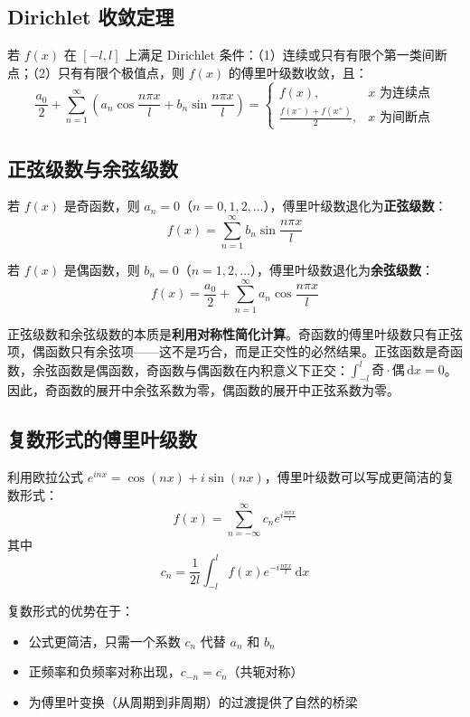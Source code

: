 \subsection{Dirichlet 收敛定理}

若 $f(x)$ 在 $[-l, l]$ 上满足 Dirichlet 条件：（1）连续或只有有限个第一类间断点；（2）只有有限个极值点，则 $f(x)$ 的傅里叶级数收敛，且：
\[
\frac{a_0}{2} + \sum_{n=1}^\infty \left(a_n\cos\frac{n\pi x}{l} + b_n\sin\frac{n\pi x}{l}\right) = \begin{cases} f(x), & x\text{ 为连续点} \\ \frac{f(x^-)+f(x^+)}{2}, & x\text{ 为间断点} \end{cases}
\]

\subsection{正弦级数与余弦级数}

若 $f(x)$ 是奇函数，则 $a_n = 0$（$n = 0, 1, 2, \ldots$），傅里叶级数退化为\textbf{正弦级数}：
\[
f(x) = \sum_{n=1}^\infty b_n\sin\frac{n\pi x}{l}
\]

若 $f(x)$ 是偶函数，则 $b_n = 0$（$n = 1, 2, \ldots$），傅里叶级数退化为\textbf{余弦级数}：
\[
f(x) = \frac{a_0}{2} + \sum_{n=1}^\infty a_n\cos\frac{n\pi x}{l}
\]

\begin{essencebox}
正弦级数和余弦级数的本质是\textbf{利用对称性简化计算}。奇函数的傅里叶级数只有正弦项，偶函数只有余弦项——这不是巧合，而是正交性的必然结果。正弦函数是奇函数，余弦函数是偶函数，奇函数与偶函数在内积意义下正交：$\int_{-l}^l \text{奇}\cdot\text{偶}\,\mathrm{d}x = 0$。因此，奇函数的展开中余弦系数为零，偶函数的展开中正弦系数为零。
\end{essencebox}

\subsection{复数形式的傅里叶级数}

利用欧拉公式 $e^{inx} = \cos(nx) + i\sin(nx)$，傅里叶级数可以写成更简洁的复数形式：
\[
f(x) = \sum_{n=-\infty}^{\infty} c_n e^{i\frac{n\pi x}{l}}
\]
其中
\[
c_n = \frac{1}{2l}\int_{-l}^{l} f(x)e^{-i\frac{n\pi x}{l}}\,\mathrm{d}x
\]

复数形式的优势在于：
\begin{itemize}[leftmargin=2em]
    \item 公式更简洁，只需一个系数 $c_n$ 代替 $a_n$ 和 $b_n$
    \item 正频率和负频率对称出现，$c_{-n} = \overline{c_n}$（共轭对称）
    \item 为傅里叶变换（从周期到非周期）的过渡提供了自然的桥梁
\end{itemize}

